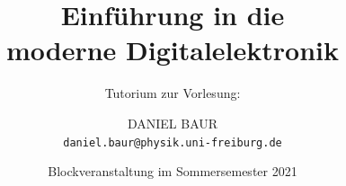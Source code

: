\documentclass[aspectratio=169, 14pt]{beamer}
\begin{document}
\title{Einführung in die\\ moderne Digitalelektronik}
\subtitle{Tutorium zur Vorlesung:}
\date{Blockveranstaltung im Sommersemester 2021}
\author{D{\fontsize{10}{10}\selectfont ANIEL} B{\fontsize{10}{10}\selectfont AUR}\\ \texttt{daniel.baur@physik.uni-freiburg.de}}
\begin{frame}
    \titlepage
    \setcounter{framenumber}{0}
\end{frame}




\end{document}
